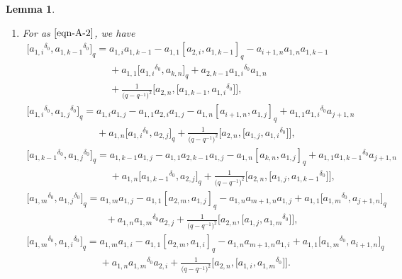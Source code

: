 \documentclass[10pt,a4paper]{amsart}
\numberwithin{equation}{section}
\def\lr#1{\left[#1\right]}
\def\d{\delta}
\def\A{\mathscr{A}}
\newtheorem{Lemma}[Theorem]{Lemma}
\begin{document}
\begin{Lemma}\quad
\begin{enumerate}\itemsep=0pt
\item[$(1)$] For \smash{$\A_{1,k,i+1}^{i,j,m} $} as $\eqref{eqn-A-2}$, we have
\begin{gather}%
\bigl[{a_{1,i}}^{\d_0},{a_{1,k-1}}^{\d_0}]_q =a_{1,i}a_{1,k-1}-a_{1,1}\lr{a_{2,i},a_{1,k-1}}_q -a_{i+1,n}a_{1,n}a_{1,k-1} \nonumber\\
\phantom{\bigl[{a_{1,i}}^{\d_0},{a_{1,k-1}}^{\d_0}\bigr]_q =}{}+a_{1,1}\bigl[{a_{1,i}}^{\d_0},a_{k,n}\bigr]_q
+a_{2,k-1}{a_{1,i}}^{\d_0}a_{1,n}\nonumber\\
\phantom{\bigl[{a_{1,i}}^{\d_0},{a_{1,k-1}}^{\d_0}\bigr]_q =}{}+\frac{1}{\bigl(q-q^{-1}\bigr)^2}\bigl[a_{2,n}, \bigl[a_{1,k-1}, {a_{1,i}}^{\d_0}\bigr]\bigr] , \label{r0-1}\\
\bigl[{a_{1,i}}^{\d_0},{a_{1,j}}^{\d_0} \bigr]_q =a_{1,i}a_{1,j} -a_{1,1}a_{2,i}a_{1,j} -a_{1,n}\lr{a_{i+1,n},a_{1,j}}_q +a_{1,1}{a_{1,i}}^{\d_0}a_{j+1,n} \nonumber\\
\phantom{\bigl[{a_{1,i}}^{\d_0},{a_{1,j}}^{\d_0} \bigr]_q =}{}
+a_{1,n}\bigl[{a_{1,i}}^{\d_0},a_{2,j}\bigr]_q+\frac{1}{\bigl(q-q^{-1}\bigr)^2}\bigl[a_{2,n}, \bigl[a_{1,j}, {a_{1,i}}^{\d_0}\bigr]\bigr],\label{r0-2}\\
\bigl[{a_{1,k-1}}^{\d_0},{a_{1,j}}^{\d_0}\bigr]_q =a_{1,k-1}a_{1,j}-a_{1,1}a_{2,k-1}a_{1,j} -a_{1,n}\lr{a_{k,n},a_{1,j}}_q +a_{1,1}{a_{1,k-1}}^{\d_0}a_{j+1,n} \nonumber\\
\phantom{\bigl[{a_{1,k-1}}^{\d_0},{a_{1,j}}^{\d_0}\bigr]_q =}{}
+a_{1,n}\bigl[{a_{1,k-1}}^{\d_0},a_{2,j}\bigr]_q+\frac{1}{\bigl(q-q^{-1}\bigr)^2}\bigl[a_{2,n}, \bigl[a_{1,j}, {a_{1,k-1}}^{\d_0}\bigr]\bigr], \label{r0-3}\\
\bigl[{a_{1,m}}^{\d_0},{a_{1,j}}^{\d_0}\bigr]_q
=a_{1,m}a_{1,j}- a_{1,1}\lr{a_{2,m},a_{1,j}}_q -a_{1,n}a_{m+1,n}a_{1,j} +a_{1,1}\bigl[{a_{1,m}}^{\d_0},a_{j+1,n}\bigr]_q \nonumber\\
\phantom{\bigl[{a_{1,m}}^{\d_0},{a_{1,j}}^{\d_0}\bigr]_q
=a}{}
+a_{1,n}{a_{1,m}}^{\d_0}a_{2,j}+\frac{1}{\bigl(q-q^{-1}\bigr)^2}\bigl[a_{2,n}, \bigl[a_{1,j}, {a_{1,m}}^{\d_0}\bigr]\bigr],\nonumber\\
\bigl[{a_{1,m}}^{\d_0},{a_{1,i}}^{\d_0}\bigr]_q
=a_{1,m}a_{1,i} -a_{1,1}\lr{a_{2,m},a_{1,i}}_q -a_{1,n}a_{m+1,n}a_{1,i} +a_{1,1}\bigl[{a_{1,m}}^{\d_0},a_{i+1,n}\bigr]_q \nonumber\\
\phantom{\bigl[{a_{1,m}}^{\d_0},{a_{1,i}}^{\d_0}\bigr]_q
=}{}
+a_{1,n}{a_{1,m}}^{\d_0}a_{2,i}+\frac{1}{\bigl(q-q^{-1}\bigr)^2}\bigl[a_{2,n}, \bigl[a_{1,i}, {a_{1,m}}^{\d_0}\bigr]\bigr].\nonumber

\end{gather}
\end{enumerate}
\end{Lemma}
\end{document}
